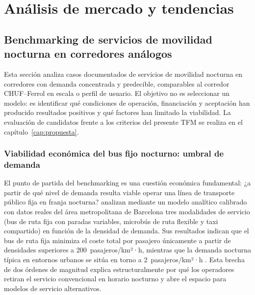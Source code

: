 
\section{An\'alisis de mercado y tendencias}
\label{sec:mercado-tendencias}

\subsection{Benchmarking de servicios de movilidad nocturna en corredores análogos}
\label{sec:benchmarking}

Esta sección analiza casos documentados de servicios
de movilidad nocturna en corredores con demanda
concentrada y predecible, comparables al corredor
CHUF--Ferrol en escala o perfil de usuario. El objetivo
no es seleccionar un modelo: es identificar qué
condiciones de operación, financiación y aceptación
han producido resultados positivos y qué factores han
limitado la viabilidad. La evaluación de candidatos
frente a los criterios del presente TFM se realiza
en el capítulo~\ref{cap:propuesta}.

\subsubsection{Viabilidad económica del bus fijo nocturno: umbral de demanda}
\label{sec:umbral-demanda}

El punto de partida del benchmarking es una cuestión
económica fundamental: ¿a partir de qué nivel de demanda
resulta viable operar una línea de transporte público
fija en franja nocturna? \textcite{Estrada2021} analizan
mediante un modelo analítico calibrado con datos reales
del área metropolitana de Barcelona tres modalidades de
servicio (bus de ruta fija con paradas variables,
microbús de ruta flexible y taxi compartido) en función
de la densidad de demanda. Sus resultados indican que
el bus de ruta fija minimiza el coste total por pasajero
únicamente a partir de densidades superiores a
200~pasajeros/km²·h, mientras que la demanda nocturna
típica en entornos urbanos se sitúa en torno a
2~pasajeros/km²·h \parencite{Estrada2021}. Esta brecha
de dos órdenes de magnitud explica estructuralmente
por qué los operadores retiran el servicio convencional
en horario nocturno y abre el espacio para modelos
de servicio alternativos.

